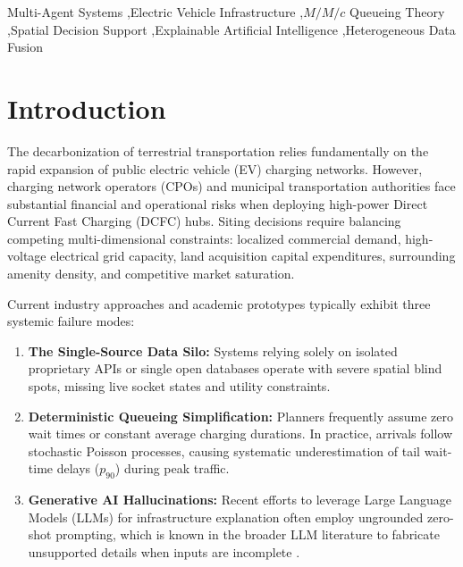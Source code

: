 \documentclass[preprint,12pt,authoryear]{elsarticle}
\begin{document}
\begin{frontmatter}
\begin{abstract}
hallucination-mitigation claims can be made empirically.
\end{abstract}

\begin{keyword}
Multi-Agent Systems \sep Electric Vehicle Infrastructure \sep $M/M/c$ Queueing Theory \sep Spatial Decision Support \sep Explainable Artificial Intelligence \sep Heterogeneous Data Fusion
\end{keyword}

\end{frontmatter}

\section{Introduction}
\label{sec:intro}
The decarbonization of terrestrial transportation relies fundamentally on the rapid expansion of public electric vehicle (EV) charging networks. However, charging network operators (CPOs) and municipal transportation authorities face substantial financial and operational risks when deploying high-power Direct Current Fast Charging (DCFC) hubs. Siting decisions require balancing competing multi-dimensional constraints: localized commercial demand, high-voltage electrical grid capacity, land acquisition capital expenditures, surrounding amenity density, and competitive market saturation.

Current industry approaches and academic prototypes typically exhibit three systemic failure modes:
\begin{enumerate}
    \item \textbf{The Single-Source Data Silo:} Systems relying solely on isolated proprietary APIs or single open databases operate with severe spatial blind spots, missing live socket states and utility constraints.
    \item \textbf{Deterministic Queueing Simplification:} Planners frequently assume zero wait times or constant average charging durations. In practice, arrivals follow stochastic Poisson processes, causing systematic underestimation of tail wait-time delays ($p_{90}$) during peak traffic.
    \item \textbf{Generative AI Hallucinations:} Recent efforts to leverage Large Language Models (LLMs) for infrastructure explanation often employ ungrounded zero-shot prompting, which is known in the broader LLM literature to fabricate unsupported details when inputs are incomplete \citep{lewis2020retrieval}.
\end{enumerate}
\end{document}
